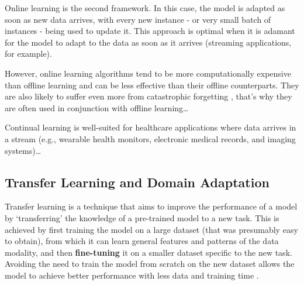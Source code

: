 \documentclass[../main.tex]{subfiles}
\begin{document}


   Online learning is the second framework. In this case, the model is adapted as soon as new data arrives, with every new instance - or very small batch of instances - being used to update it. This approach is optimal when it is adamant for the model to adapt to the data as soon as it arrives (streaming applications, for example). 
   
   However, online learning algorithms tend to be more computationally expensive than offline learning and can be less effective than their offline counterparts. They are also likely to suffer even more from catastrophic forgetting \cite{huyen_designing_2022}, that's why they are often used in conjunction with offline learning\dots

   Continual learning is well-suited for healthcare applications where data arrives in a stream (e.g., wearable health monitors, electronic medical records, and imaging systems)\dots


    \subsection{Transfer Learning and Domain Adaptation} \label{sec:transfer_learning} 

    Transfer learning is a technique that aims to improve the performance of a model by `transferring' the knowledge of a pre-trained model to a new task. This is achieved by first training the model on a large dataset (that was presumably easy to obtain), from which it can learn general features and patterns of the data modality, and then \textbf{fine-tuning} it on a smaller dataset specific to the new task. Avoiding the need to train the model from scratch on the new dataset allows the model to achieve better performance with less data and training time \cite{panSurveyTransferLearning2010}.
\end{document}
